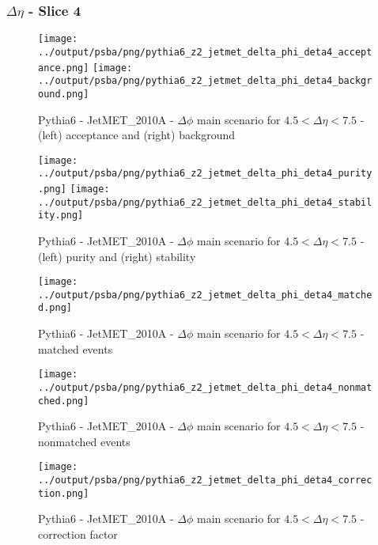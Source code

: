\documentclass[11pt]{book}
\begin{document}
\clearpage
\subsubsection{$\Delta\eta$ - Slice 4}

\begin{figure}[ht]
\centering
\texttt{[image: ../output/psba/png/pythia6\_z2\_jetmet\_delta\_phi\_deta4\_acceptance.png]}
\texttt{[image: ../output/psba/png/pythia6\_z2\_jetmet\_delta\_phi\_deta4\_background.png]}
\caption{Pythia6 - JetMET\_2010A - $\Delta\phi$ main scenario for $4.5 < \Delta\eta < 7.5$ - (left) acceptance and (right) background}
\label{fig:p6_jetmet_delta_phi_deta4_ab}
\end{figure}

\begin{figure}[ht]
\centering
\texttt{[image: ../output/psba/png/pythia6\_z2\_jetmet\_delta\_phi\_deta4\_purity.png]}
\texttt{[image: ../output/psba/png/pythia6\_z2\_jetmet\_delta\_phi\_deta4\_stability.png]}
\caption{Pythia6 - JetMET\_2010A - $\Delta\phi$ main scenario for $4.5 < \Delta\eta < 7.5$ - (left) purity and (right) stability}
\label{fig:p6_jetmet_delta_phi_deta4_ps}
\end{figure}

\begin{figure}[ht]
\centering
\texttt{[image: ../output/psba/png/pythia6\_z2\_jetmet\_delta\_phi\_deta4\_matched.png]}
\caption{Pythia6 - JetMET\_2010A - $\Delta\phi$ main scenario for $4.5 < \Delta\eta < 7.5$ - matched events}
\label{fig:p6_jetmet_delta_phi_deta4_matched}
\end{figure}

\begin{figure}[ht]
\centering
\texttt{[image: ../output/psba/png/pythia6\_z2\_jetmet\_delta\_phi\_deta4\_nonmatched.png]}
\caption{Pythia6 - JetMET\_2010A - $\Delta\phi$ main scenario for $4.5 < \Delta\eta < 7.5$ - nonmatched events}
\label{fig:p6_jetmet_delta_phi_deta4_nonmatched}
\end{figure}

\begin{figure}[ht]
\centering
\texttt{[image: ../output/psba/png/pythia6\_z2\_jetmet\_delta\_phi\_deta4\_correction.png]}
\caption{Pythia6 - JetMET\_2010A - $\Delta\phi$ main scenario for $4.5 < \Delta\eta < 7.5$ - correction factor}
\label{fig:p6_jetmet_delta_phi_deta4_correction}
\end{figure}
\end{document}
